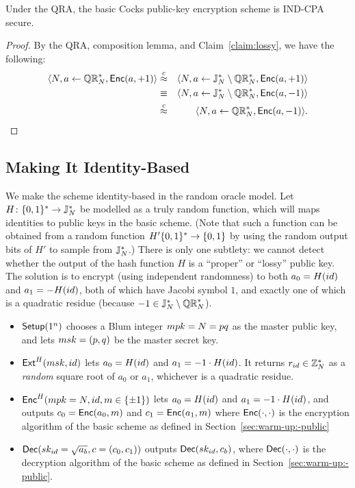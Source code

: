 \documentclass[11pt]{article}
\begin{document}
\begin{corollary}
  \label{cor:ind-cpa-cocks-basic}
  Under the QRA, the basic Cocks public-key encryption scheme is
  IND-CPA secure.
\end{corollary}

\begin{proof}
  By the QRA, composition lemma, and Claim~\ref{claim:lossy}, we have
  the following:
  \begin{eqnarray*}
    \langle N, a \gets \mathbb{QR}_{N}^{*}, \mathsf{Enc}(a, +1) \rangle & \stackrel{c}{\approx} &
    \langle N, a \gets \mathbb{J}_N^{*} \setminus \mathbb{QR}_{N}^{*}, \mathsf{Enc}(a, +1)
    \rangle \\
    & \equiv & \langle N, a \gets \mathbb{J}_N^{*} \setminus \mathbb{QR}_{N}^{*},
    \mathsf{Enc}(a, -1) \rangle \\
    & \stackrel{c}{\approx} & \langle N, a \gets \mathbb{QR}_{N}^{*}, \mathsf{Enc}(a, -1) \rangle. \qedhere
  \end{eqnarray*}
\end{proof}

\subsection{Making It Identity-Based}
\label{sec:making-id-based}

We make the scheme identity-based in the random oracle model.  Let $H
\colon \{0,1\}^{*} \to \mathbb{J}_N^{*}$ be modelled as a truly random function,
which will maps identities to public keys in the basic scheme.  (Note
that such a function can be obtained from a random function $H'
\{0,1\}^{*} \to \{0,1\}$ by using the random output bits of $H'$ to sample
from $\mathbb{J}_N^{*}$.)  There is only one subtlety: we cannot detect whether
the output of the hash function $H$ is a ``proper'' or ``lossy''
public key.  The solution is to encrypt (using independent randomness)
to both $a_{0} = H(id)$ and $a_{1} = -H(id)$, both of which have
Jacobi symbol $1$, and exactly one of which is a quadratic residue
(because $-1 \in \mathbb{J}_N^{*} \setminus \mathbb{QR}_{N}^{*}$).

\begin{itemize}
\item $\mathsf{Setup}(1^{n})$ chooses a Blum integer $mpk = N = pq$ as the
  master public key, and lets $msk = (p,q)$ be the master secret key.
\item $\mathsf{Ext}^{H}(msk, id)$ lets $a_0 = H(id)$ and $a_1 = -1 \cdot
  H(id)$.  It returns $r_{id} \in \mathbb{Z}_N^{*}$ as a \emph{random} square
  root of $a_0$ or $a_1$, whichever is a quadratic residue.
\item $\mathsf{Enc}^{H}(mpk = N, id, m \in \{\pm 1\})$ lets $a_0 =
  H(id)$ and $a_1 = -1 \cdot H(id)$, and outputs $c_0 =
  \mathsf{Enc}(a_0,m)$ and $c_1 = \mathsf{Enc}(a_1,m)$ where $\mathsf{Enc}(\cdot,
  \cdot)$ is the encryption algorithm of the basic scheme as defined
  in Section~\ref{sec:warm-up:-public}
\item $\mathsf{Dec}(sk_{id} = \sqrt{a_b}, c = (c_0,c_1))$ outputs
  $\mathsf{Dec}(sk_{id}, c_b)$, where $\mathsf{Dec}(\cdot,\cdot)$ is the
  decryption algorithm of the basic scheme as defined in
  Section~\ref{sec:warm-up:-public}.
\end{itemize}
\end{document}
